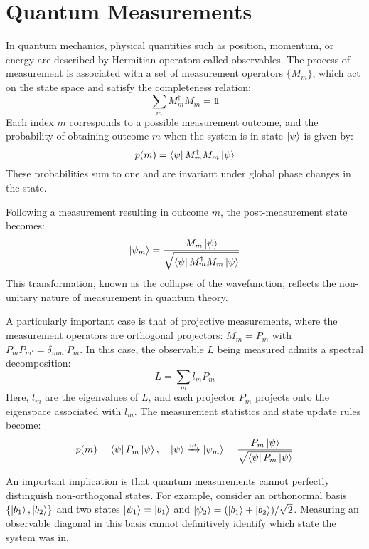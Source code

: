\section{Quantum Measurements}
In quantum mechanics, physical quantities such as position, momentum, or energy are described by Hermitian operators called observables. The process of measurement is associated with a set of measurement operators $\{M_m\}$, which act on the state space and satisfy the completeness relation:
\begin{equation}
    \sum_m M_m^\dagger M_m = \mathbb{1}
\end{equation}
Each index $m$ corresponds to a possible measurement outcome, and the probability of obtaining outcome $m$ when the system is in state $\ket{\psi}$ is given by:
\begin{equation}
    p(m) = \bra{\psi} M_m^\dagger M_m \ket{\psi}
\end{equation}
These probabilities sum to one and are invariant under global phase changes in the state.

Following a measurement resulting in outcome $m$, the post-measurement state becomes:
\begin{equation}
    \ket{\psi_m} = \frac{M_m \ket{\psi}}{\sqrt{\bra{\psi} M_m^\dagger M_m \ket{\psi}}}
\end{equation}
This transformation, known as the collapse of the wavefunction, reflects the non-unitary nature of measurement in quantum theory.

A particularly important case is that of projective measurements, where the measurement operators are orthogonal projectors: $M_m = P_m$ with $P_m P_{m'} = \delta_{mm'} P_m$. In this case, the observable $L$ being measured admits a spectral decomposition:
\begin{equation}
    L = \sum_m l_m P_m
\end{equation}
Here, $l_m$ are the eigenvalues of $L$, and each projector $P_m$ projects onto the eigenspace associated with $l_m$. The measurement statistics and state update rules become:
\begin{equation}
    p(m) = \bra{\psi} P_m \ket{\psi}, \quad
    \ket{\psi} \xrightarrow{m} \ket{\psi_m} = \frac{P_m \ket{\psi}}{\sqrt{\bra{\psi} P_m \ket{\psi}}}
\end{equation}

An important implication is that quantum measurements cannot perfectly distinguish non-orthogonal states. For example, consider an orthonormal basis $\{\ket{b_1}, \ket{b_2}\}$ and two states $\ket{\psi_1} = \ket{b_1}$ and $\ket{\psi_2} = (\ket{b_1} + \ket{b_2})/\sqrt{2}$. Measuring an observable diagonal in this basis cannot definitively identify which state the system was in.

